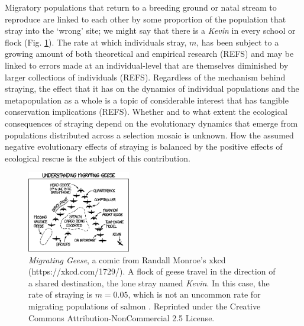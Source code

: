 \documentclass[twocolumn,preprintnumbers,amsmath,amssymb,superscriptaddress]{revtex4}
\begin{document}
Migratory populations that return to a breeding ground or natal stream to reproduce are linked to each other by some proportion of the population that stray into the `wrong' site; we might say that there is a \emph{Kevin} in every school or flock (Fig. \ref{fig:xkcd}).
The rate at which individuals stray, $m$, has been subject to a growing amount of both theoretical and empirical research (REFS) and may be linked to errors made at an individual-level that are themselves diminished by larger collections of individuals (REFS).
Regardless of the mechanism behind straying, the effect that it has on the dynamics of individual populations and the metapopulation as a whole is a topic of considerable interest that has tangible conservation implications (REFS).
Whether and to what extent the ecological consequences of straying depend on the evolutionary dynamics that emerge from populations distributed across a selection mosaic is unknown.
How the assumed negative evolutionary effects of straying is balanced by the positive effects of ecological rescue is the subject of this contribution.


\begin{figure}
\centering
\includegraphics[width=0.4\textwidth]{figs/fig_xkcd.png}
\caption{
\emph{Migrating Geese}, a comic from Randall Monroe's xkcd (https://xkcd.com/1729/). 
A flock of geese travel in the direction of a shared destination, the lone stray named \emph{Kevin}.
In this case, the rate of straying is $m=0.05$, which is not an uncommon rate for migrating populations of salmon \cite{Satterthwaite:2015ge}. 
Reprinted under the Creative Commons Attribution-NonCommercial 2.5 License.
} \label{fig:xkcd}
\end{figure}
\end{document}
